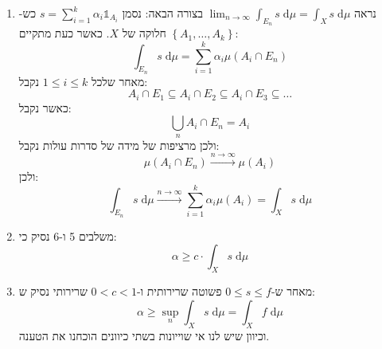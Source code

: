 \documentclass{tstextbook}
\begin{document}
\begin{theorem}
\begin{enumerate}
    \item נראה \(\lim_{ n \to \infty }\int _{E_{n}}s \;\mathrm{d} \mu=\int _{X}s \;\mathrm{d} \mu\) בצורה הבאה: 
נסמן \(s=\sum_{i=1}^{k}\alpha_{i}\mathbb{1}_{A_{i}}\) כש-\(\left\{  A_{1},\dots,A_{k}  \right\}\) חלוקה של \(X\). כאשר כעת מתקיים:
$$\int _{E_{n}}s \;\mathrm{d} \mu = \sum_{i=1}^{k}  \alpha_{i}\mu\left( A_{i}\cap E_{n} \right) $$
מאחר שלכל \(1\leq i \leq k\) נקבל:
$$A_{i}\cap E_{1}\subseteq A_{i}\cap E_{2}\subseteq A_{i}\cap E_{3}\subseteq \dots$$
כאשר נקבל:
$$\bigcup_{n}A_{i}\cap E_{n}=A_{i}$$
ולכן מרציפות של מידה של סדרות עולות נקבל:
$$\mu\left( A_{i}\cap E_{n} \right)\xrightarrow{n\to \infty} \mu(A_{i})$$
ולכן:
$$\int _{E_{n}} s\;\mathrm{d} \mu \xrightarrow{n\to\infty } \sum_{i=1}^{k}\alpha_{i}\mu(A_{i})=\int _{X}s \;\mathrm{d} \mu  $$


    \item משלבים 5 ו-6 נסיק כי: 
$$\alpha \geq c \cdot \int _{X} s  \;\mathrm{d} \mu $$


    \item מאחר ש-\(0\leq s\leq f\) פשוטה שרירותית ו-\(0< c < 1\) שרירותי נסיק ש: 
$$\alpha \geq \sup_{n}  \int_{X} s \;\mathrm{d} \mu =\int _{X}f \;\mathrm{d} \mu$$
וכיוון שיש לנו אי שוייונות בשתי כיוונים הוכחנו את הטענה.


  \end{enumerate}
\end{theorem}
\end{document}
